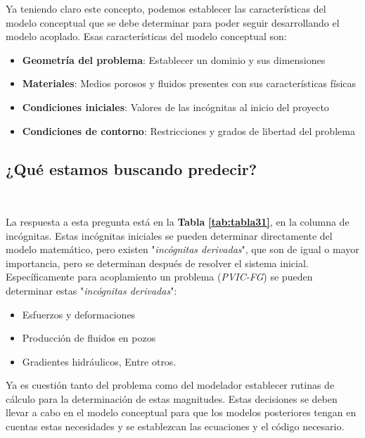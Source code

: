 Ya teniendo claro este concepto, podemos establecer las características del modelo conceptual que se debe determinar para poder seguir desarrollando el modelo acoplado. Esas características del modelo conceptual son:

\begin{itemize}
    \item \textbf{Geometría del problema}: Establecer un dominio y sus dimensiones
    \item \textbf{Materiales}: Medios porosos y fluidos presentes con sus características físicas
    \item \textbf{Condiciones iniciales}: Valores de las incógnitas al inicio del proyecto
    \item \textbf{Condiciones de contorno}: Restricciones y grados de libertad del problema
\end{itemize}
\bigskip

\subsection{¿Qué estamos buscando predecir?}~\hypertarget{sec:sec312}{}
\label{sec:sec312}

La respuesta a esta pregunta está en la \textbf{Tabla} \textbf{\ref{tab:tabla31}}, en la columna de incógnitas. Estas incógnitas iniciales se pueden determinar directamente del modelo matemático, pero existen "\textit{incógnitas derivadas}", que son de igual o mayor importancia, pero se determinan después de resolver el sistema inicial. Específicamente para acoplamiento un problema (\textit{PVIC-FG}) se pueden determinar estas "\textit{incógnitas derivadas}":

\begin{itemize}
    \item Esfuerzos y deformaciones
    \item Producción de fluidos en pozos
    \item Gradientes hidráulicos, Entre otros.
\end{itemize}

Ya es cuestión tanto del problema como del modelador establecer rutinas de cálculo para la determinación de estas magnitudes. Estas decisiones se deben llevar a cabo en el modelo conceptual para que los modelos posteriores tengan en cuentas estas necesidades y se establezcan las ecuaciones y el código necesario.\bigskip

